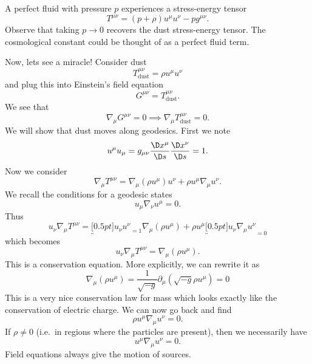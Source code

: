 A perfect fluid
with pressure $p$ experiences a stress-energy tensor
\begin{equation}
T^{\mu\nu}=(p+\rho)u^{\mu}u^{\nu}-pg^{\mu\nu}.
\end{equation}
Observe that taking $p\to0$ recovers the dust stress-energy
tensor. The cosmological constant could be thought of as a
perfect fluid term.

Now, lets see a miracle! Consider dust
\begin{equation}
T^{\mu\nu}_{\text{dust}}=\rho u^{\mu}u^{\nu}
\end{equation}
and plug this into Einstein's field equation
\begin{equation}
G^{\mu\nu}=T^{\mu\nu}_{\text{dust}}.
\end{equation}
We see that
\begin{equation}
\nabla_{\mu}G^{\mu\nu}=0\implies\nabla_{\mu} T^{\mu\nu}_{\text{dust}}=0.
\end{equation}
We will show that dust moves along geodesics. First we note
\begin{equation}
u^{\mu}u_{\mu}=g_{\mu\nu}\frac{\D x^{\mu}}{\D s}\frac{\D x^{\nu}}{\D s}=1.
\end{equation}
Now we consider
\begin{equation}
\nabla_{\mu}T^{\mu\nu}=\nabla_{\mu}(\rho u^{\mu})u^{\nu}+\rho u^{\mu}\nabla_{\mu}
u^{\nu}.
\end{equation}
We recall the conditions for a geodesic states
\begin{equation}
u_{\mu}\nabla_{\nu}u^{\mu}=0.
\end{equation}
Thus
\begin{equation}
u_{\nu}\nabla_{\mu}T^{\mu\nu}=\underbracket[0.5pt]{u_{\nu}u^{\nu}}_{=1}\nabla_{\mu}(\rho u^{\mu})
+\rho u^{\mu}\underbracket[0.5pt]{u_{\nu}\nabla_{\mu}u^{\nu}}_{=0}
\end{equation}
which becomes
\begin{equation}
u_{\nu}\nabla_{\mu}T^{\mu\nu}=\nabla_{\mu}(\rho u^{\mu}).
\end{equation}
This is a conservation equation. More explicitly, we can rewrite
it as
\begin{equation}
\nabla_{\mu}(\rho u^{\mu})=
\frac{1}{\sqrt{-g}}\partial_{\mu}(\sqrt{-g}\rho u^{\mu})=0
\end{equation}
This is a very nice conservation law for mass which looks exactly
like the conservation of electric charge. We can now go back and
find
\begin{equation}
\rho u^{\mu}\nabla_{\mu}u^{\nu}=0.
\end{equation}
If $\rho\not=0$ (i.e.~in regions where the particles are
present), then we necessarily have
\begin{equation}
u^{\mu}\nabla_{\mu}u^{\nu}=0.
\end{equation}
Field equations always give the motion of sources.

